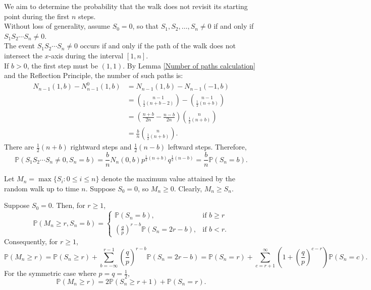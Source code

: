 \documentclass{huhtakm-template-book}
\newcommand{\prob}{\mathbb{P}}
\begin{document}
    \begin{eg}
        We aim to determine the probability that the walk does not revisit its starting point during the first $n$ steps.\\
        Without loss of generality, assume $S_{0}=0$, so that $S_{1},S_{2},\dots,S_{n}\neq 0$ if and only if $S_{1}S_{2}\cdots S_{n}\neq 0$.\\
        The event $S_{1}S_{2}\cdots S_{n}\neq 0$ occurs if and only if the path of the walk does not intersect the $x$-axis during the interval $[1,n]$.\\
        If $b>0$, the first step must be $(1,1)$. By Lemma \ref{Number of paths calculation} and the Reflection Principle, the number of such paths is:
        \begin{align*}
            N_{n-1}(1,b)-N_{n-1}^{0}(1,b)&=N_{n-1}(1,b)-N_{n-1}(-1,b)\\
            &=\binom{n-1}{\frac{1}{2}(n+b-2)}-\binom{n-1}{\frac{1}{2}(n+b)}\\
            &=\left(\frac{n+b}{2n}-\frac{n-b}{2n}\right)\binom{n}{\frac{1}{2}(n+b)}\\
            &=\frac{b}{n}\binom{n}{\frac{1}{2}(n+b)}.
        \end{align*}
        There are $\frac{1}{2}(n+b)$ rightward steps and $\frac{1}{2}(n-b)$ leftward steps. Therefore,
        \begin{equation*}
            \prob(S_{1}S_{2}\cdots S_{n}\neq 0,S_{n}=b)=\frac{b}{n}N_{n}(0,b)p^{\frac{1}{2}(n+b)}q^{\frac{1}{2}(n-b)}=\frac{b}{n}\prob(S_{n}=b).
        \end{equation*}
    \end{eg}
    \begin{eg}
        Let $M_{n}=\max\{S_{i}:0\leq i\leq n\}$ denote the maximum value attained by the random walk up to time $n$. Suppose $S_{0}=0$, so $M_{n}\geq 0$. Clearly, $M_{n}\geq S_{n}$.
    \end{eg}
    \begin{thm}
        Suppose $S_{0}=0$. Then, for $r\geq 1$,
        \begin{equation*}
            \prob(M_{n}\geq r,S_{n}=b)=\begin{cases}
                \prob(S_{n}=b), &\text{if }b\geq r\\
                \left(\frac{q}{p}\right)^{r-b}\prob(S_{n}=2r-b), &\text{if }b<r.
            \end{cases}
        \end{equation*}
        Consequently, for $r\geq 1$,
        \begin{equation*}
            \prob(M_{n}\geq r)=\prob(S_{n}\geq r)+\sum_{b=-\infty}^{r-1}\left(\frac{q}{p}\right)^{r-b}\prob(S_{n}=2r-b)=\prob(S_{n}=r)+\sum_{c=r+1}^{\infty}\left(1+\left(\frac{q}{p}\right)^{c-r}\right)\prob(S_{n}=c).
        \end{equation*}
        For the symmetric case where $p=q=\frac{1}{2}$,
        \begin{equation*}
            \prob(M_{n}\geq r)=2\prob(S_{n}\geq r+1)+\prob(S_{n}=r).
        \end{equation*}
    \end{thm}
\end{document}

